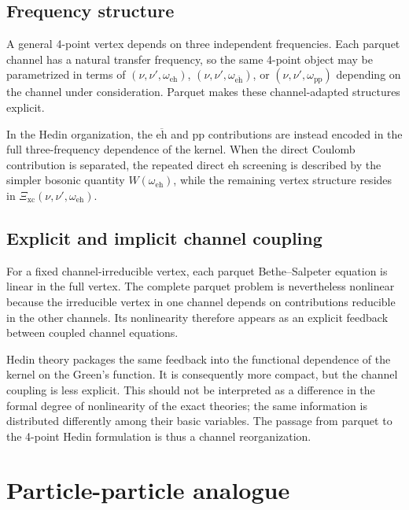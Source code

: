 \documentclass[aip,jcp,reprint,noshowkeys,superscriptaddress]{revtex4-1}
\newcommand{\eh}{\text{eh}}
\newcommand{\teh}{\overline{\text{eh}}}
\newcommand{\pp}{\text{pp}}
\newcommand{\xc}{\text{xc}}
\begin{document}
\subsection{Frequency structure}

A general 4-point vertex depends on three independent frequencies.
Each parquet channel has a natural transfer frequency, so the same
4-point object may be parametrized in terms of
$(\nu,\nu',\omega_\eh)$, $(\nu,\nu',\omega_{\teh})$, or
$(\nu,\nu',\omega_\pp)$ depending on the channel under consideration.
Parquet makes these channel-adapted structures explicit.

In the Hedin organization, the $\teh$ and $\pp$ contributions are instead
encoded in the full three-frequency dependence of the kernel.
When the direct Coulomb contribution is separated, the repeated direct
$\eh$ screening is described by the simpler bosonic quantity
$W(\omega_\eh)$, while the remaining vertex structure resides in
$\Xi_{\xc}(\nu,\nu',\omega_\eh)$.

\subsection{Explicit and implicit channel coupling}

For a fixed channel-irreducible vertex, each parquet Bethe--Salpeter
equation is linear in the full vertex.
The complete parquet problem is nevertheless nonlinear because the
irreducible vertex in one channel depends on contributions reducible in
the other channels.
Its nonlinearity therefore appears as an explicit feedback between
coupled channel equations.

Hedin theory packages the same feedback into the functional dependence of
the kernel on the Green's function.
It is consequently more compact, but the channel coupling is less
explicit.
This should not be interpreted as a difference in the formal degree of
nonlinearity of the exact theories; the same information is distributed
differently among their basic variables.
The passage from parquet to the 4-point Hedin formulation is thus a
channel reorganization.

\section{Particle-particle analogue}
\label{sec:pp_analogue}
\end{document}
